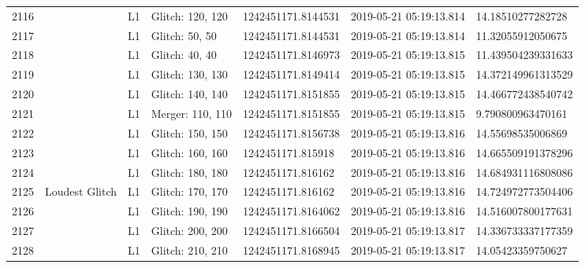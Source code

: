 \begin{longtable}{lllllll}
2116 &                                                    &       L1 &  Glitch: 120, 120 &  1242451171.8144531 &  2019-05-21 05:19:13.814 &   14.18510277282728 \\
2117 &                                                    &       L1 &    Glitch: 50, 50 &  1242451171.8144531 &  2019-05-21 05:19:13.814 &   11.32055912050675 \\
2118 &                                                    &       L1 &    Glitch: 40, 40 &  1242451171.8146973 &  2019-05-21 05:19:13.815 &  11.439504239331633 \\
2119 &                                                    &       L1 &  Glitch: 130, 130 &  1242451171.8149414 &  2019-05-21 05:19:13.815 &  14.372149961313529 \\
2120 &                                                    &       L1 &  Glitch: 140, 140 &  1242451171.8151855 &  2019-05-21 05:19:13.815 &  14.466772438540742 \\
2121 &                                                    &       L1 &  Merger: 110, 110 &  1242451171.8151855 &  2019-05-21 05:19:13.815 &   9.790800963470161 \\
2122 &                                                    &       L1 &  Glitch: 150, 150 &  1242451171.8156738 &  2019-05-21 05:19:13.816 &   14.55698535006869 \\
2123 &                                                    &       L1 &  Glitch: 160, 160 &   1242451171.815918 &  2019-05-21 05:19:13.816 &  14.665509191378296 \\
2124 &                                                    &       L1 &  Glitch: 180, 180 &   1242451171.816162 &  2019-05-21 05:19:13.816 &  14.684931116808086 \\
2125 &                                     Loudest Glitch &       L1 &  Glitch: 170, 170 &   1242451171.816162 &  2019-05-21 05:19:13.816 &  14.724972773504406 \\
2126 &                                                    &       L1 &  Glitch: 190, 190 &  1242451171.8164062 &  2019-05-21 05:19:13.816 &  14.516007800177631 \\
2127 &                                                    &       L1 &  Glitch: 200, 200 &  1242451171.8166504 &  2019-05-21 05:19:13.817 &  14.336733337177359 \\
2128 &                                                    &       L1 &  Glitch: 210, 210 &  1242451171.8168945 &  2019-05-21 05:19:13.817 &   14.05423359750627 \\

\end{longtable}
